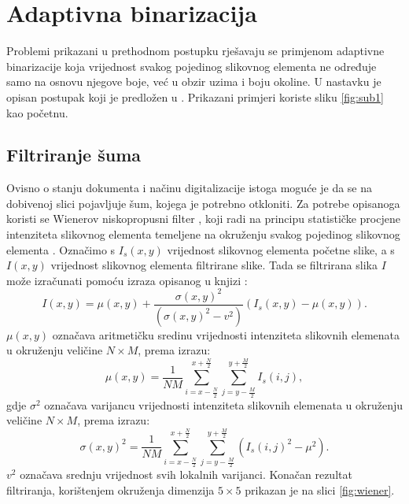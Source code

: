 \documentclass[times, utf8, zavrsni, numeric]{fer}
\begin{document}
\section{Adaptivna binarizacija}
Problemi prikazani u prethodnom postupku rješavaju se primjenom adaptivne binarizacije koja vrijednost svakog pojedinog slikovnog elementa ne određuje samo na osnovu njegove boje, već u obzir uzima i boju okoline.
U nastavku je opisan postupak koji je predložen u \cite{AdaptiveBinarization}.
Prikazani primjeri koriste sliku \ref{fig:sub1} kao početnu.

\subsection{Filtriranje šuma}
Ovisno o stanju dokumenta i načinu digitalizacije istoga moguće je da se na dobivenoj slici pojavljuje šum, kojega je potrebno otkloniti.
Za potrebe opisanoga koristi se Wienerov niskopropusni filter \cite{book:Two-Dimensional-Signal-Image-Processing}, koji radi na principu statističke procjene intenziteta slikovnog elementa temeljene na okruženju svakog pojedinog slikovnog elementa \cite{AdaptiveBinarization}.
Označimo s $I_s(x, y)$ vrijednost slikovnog elementa početne slike, a s $I(x, y)$ vrijednost slikovnog elementa filtrirane slike.
Tada se filtrirana slika $I$ može izračunati pomoću izraza opisanog u knjizi \cite{book:Two-Dimensional-Signal-Image-Processing}:
\[I(x, y) = \mu(x, y) + \frac{\sigma(x, y)^2}{(\sigma(x, y)^2 - v^2)}(I_s(x, y) - \mu(x, y)).\]
$\mu(x, y)$ označava aritmetičku sredinu vrijednosti intenziteta slikovnih elemenata u okruženju veličine $N\times M$, prema izrazu:
\[\mu(x, y) = \frac{1}{NM} 
    \displaystyle \sum_{i = x-\frac{N}{2}}^{x+\frac{N}{2}}
    \displaystyle \sum_{j = y-\frac{M}{2}}^{y+\frac{M}{2}}
I_s(i, j),\]
gdje $\sigma^2$ označava varijancu vrijednosti intenziteta slikovnih elemenata u okruženju veličine $N\times M$, prema izrazu:
\[\sigma(x, y)^2 = \frac{1}{NM} 
    \displaystyle \sum_{i = x-\frac{N}{2}}^{x+\frac{N}{2}}
    \displaystyle \sum_{j = y-\frac{M}{2}}^{y+\frac{M}{2}}
(I_s(i, j)^2 - \mu^2).\]
$v^2$ označava srednju vrijednost svih lokalnih varijanci.
Konačan rezultat filtriranja, korištenjem okruženja dimenzija $5\times 5$ prikazan je na slici \ref{fig:wiener}.
\end{document}
